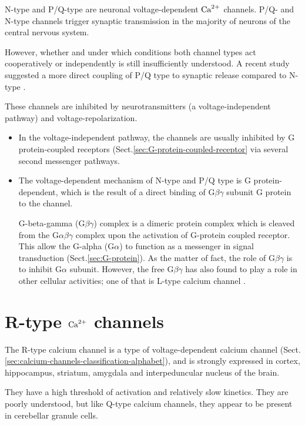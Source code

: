 N-type and P/Q-type are neuronal voltage-dependent ${\text{Ca}^{2+}}$ channels.
P/Q- and N-type channels trigger synaptic transmission in the majority of
neurons of the central nervous system. 

However, whether and under which conditions both channel types act cooperatively
or independently is still insufficiently understood.
A recent study suggested a more direct coupling of P/Q type to synaptic release
compared to N-type \citep{nimmervoll2013}.


These channels are inhibited by neurotransmitters (a voltage-independent
pathway) and voltage-repolarization. 
\begin{itemize}
  \item  In the voltage-independent pathway, the channels are
usually inhibited by G protein-coupled receptors
(Sect.\ref{sec:G-protein-coupled-receptor} via several second messenger
pathways.
  \item The voltage-dependent mechanism of N-type and P/Q type is G protein-dependent,
which is the result of a direct binding of G$\beta\gamma$ subunit G protein to
the channel. 

G-beta-gamma (G$\beta\gamma$) complex is a dimeric protein complex which is
cleaved from the G$\alpha\beta\gamma$ complex upon the activation of G-protein
coupled receptor. This allow the G-alpha (G$\alpha$) to function as a messenger
in signal transduction (Sect.\ref{sec:G-protein}). As the matter of fact, the
role of G$\beta\gamma$ is to inhibit G$\alpha$ subunit. However, the free
G$\beta\gamma$ has also found to play a role in other cellular activities; one
of that is L-type calcium channel \citep{dupre2009}.

\end{itemize}


\section{R-type ${\text{Ca}^{2+}}$ channels}
\label{sec:R-type_Ca-channel}

The R-type calcium channel is a type of voltage-dependent calcium channel
(Sect.\ref{sec:calcium-channels-classification-alphabet}), and is strongly
expressed in cortex, hippocampus, striatum, amygdala and interpeduncular nucleus
of the brain.

They have a high threshold of activation and relatively slow kinetics.
They are poorly understood, but like Q-type calcium channels, they appear to be
present in cerebellar granule cells. 

